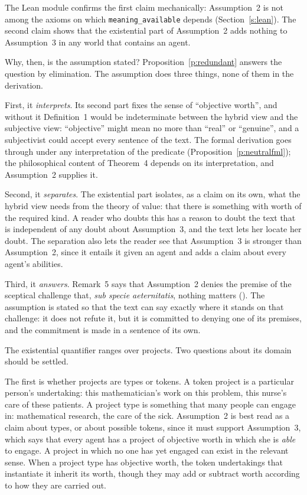 The Lean module confirms the first claim mechanically: Assumption~2 is not among the axioms on which \texttt{meaning\_available} depends (Section~\ref{s:lean}). The second claim shows that the existential part of Assumption~2 adds nothing to Assumption~3 in any world that contains an agent.

Why, then, is the assumption stated? Proposition~\ref{p:redundant} answers the question by elimination. The assumption does three things, none of them in the derivation.

First, it \emph{interprets}. Its second part fixes the sense of \enquote{objective worth}, and without it Definition~1 would be indeterminate between the hybrid view and the subjective view: \enquote{objective} might mean no more than \enquote{real} or \enquote{genuine}, and a subjectivist could accept every sentence of the text. The formal derivation goes through under any interpretation of the predicate (Proposition~\ref{p:neutralfml}); the philosophical content of Theorem~4 depends on its interpretation, and Assumption~2 supplies it.

Second, it \emph{separates}. The existential part isolates, as a claim on its own, what the hybrid view needs from the theory of value: that there is something with worth of the required kind. A reader who doubts this has a reason to doubt the text that is independent of any doubt about Assumption~3, and the text lets her locate her doubt. The separation also lets the reader see that Assumption~3 is stronger than Assumption~2, since it entails it given an agent and adds a claim about every agent's abilities.

Third, it \emph{answers}. Remark~5 says that Assumption~2 denies the premise of the sceptical challenge that, \emph{sub specie aeternitatis}, nothing matters (). The assumption is stated so that the text can say exactly where it stands on that challenge: it does not refute it, but it is committed to denying one of its premises, and the commitment is made in a sentence of its own.


The existential quantifier ranges over projects. Two questions about its domain should be settled.

The first is whether projects are types or tokens. A token project is a particular person's undertaking: this mathematician's work on this problem, this nurse's care of these patients. A project type is something that many people can engage in: mathematical research, the care of the sick. Assumption~2 is best read as a claim about types, or about possible tokens, since it must support Assumption~3, which says that every agent has a project of objective worth in which she is \emph{able} to engage. A project in which no one has yet engaged can exist in the relevant sense. When a project type has objective worth, the token undertakings that instantiate it inherit its worth, though they may add or subtract worth according to how they are carried out.

